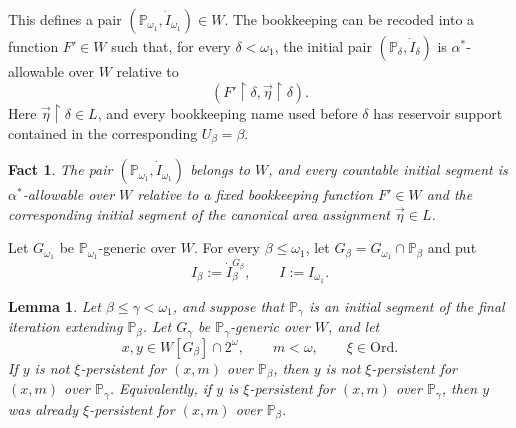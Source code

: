 \documentclass[a4paper,11pt]{article}
\newtheorem{lemma}[theorem]{Lemma}
\newtheorem{fact}[theorem]{Fact}
\newcommand{\forceP}{\mathbb{P}}
\begin{document}
This defines a pair $(\forceP_{\omega_1},\dot I_{\omega_1})\in W$.  The bookkeeping can be recoded into a function $F'\in W$ such that, for every $\delta<\omega_1$, the initial pair $(\forceP_\delta,\dot I_\delta)$ is $\alpha^\ast$-allowable over $W$ relative to
\[
   (F'\upharpoonright\delta,\vec\eta\upharpoonright\delta).
\]
Here $\vec\eta\upharpoonright\delta\in L$, and every bookkeeping name used
before $\delta$ has reservoir support contained in the corresponding
$U_\beta=\beta$.

\begin{fact}
The pair $(\forceP_{\omega_1},\dot I_{\omega_1})$ belongs to $W$, and every countable initial segment is $\alpha^\ast$-allowable over $W$ relative to a fixed bookkeeping function $F'\in W$ and the corresponding initial segment of the canonical area assignment $\vec\eta\in L$.
\end{fact}

Let $G_{\omega_1}$ be $\forceP_{\omega_1}$-generic over $W$.  For every $\beta\leq\omega_1$, let $G_\beta=G_{\omega_1}\cap\forceP_\beta$ and put
\[
   I_\beta:=\dot I_\beta^{G_\beta},
   \qquad
   I:=I_{\omega_1}.
\]

\begin{lemma}
\label{lemma-stability-of-eliminability}
Let $\beta\leq\gamma<\omega_1$, and suppose that
$\forceP_\gamma$ is an initial segment of the final iteration extending
$\forceP_\beta$.  Let $G_\gamma$ be $\forceP_\gamma$-generic over $W$, and
let
\[
   x,y\in W[G_\beta]\cap2^\omega,
   \qquad m<\omega,
   \qquad \xi\in\mathrm{Ord}.
\]
If $y$ is not $\xi$-persistent for $(x,m)$ over $\forceP_\beta$, then $y$ is
not $\xi$-persistent for $(x,m)$ over $\forceP_\gamma$.  Equivalently, if
$y$ is $\xi$-persistent for $(x,m)$ over $\forceP_\gamma$, then $y$ was
already $\xi$-persistent for $(x,m)$ over $\forceP_\beta$.
\end{lemma}
\end{document}
